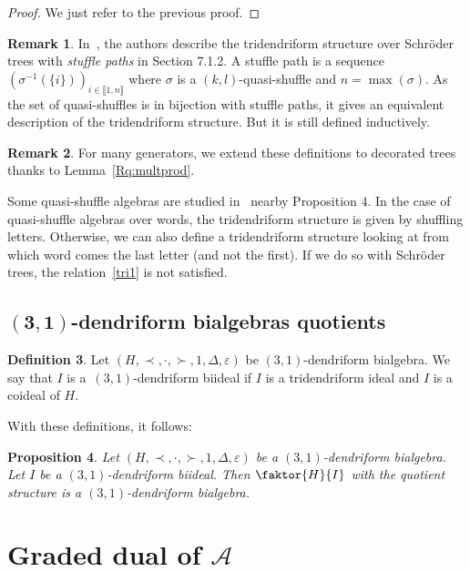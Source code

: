 \documentclass[pdftex]{sigma}
\numberwithin{equation}{section}
\theoremstyle{definition}
\newtheorem{defi}{Definition}[section]
\newtheorem{Rq}[defi]{Remark}
\theoremstyle{plain}
\newtheorem{Prop}[defi]{Proposition}
\newcommand{\IEM}[2]{\llbracket #1,#2 \rrbracket}
\begin{document}
\begin{proof}
	We just refer to the previous proof.
\end{proof}

\begin{Rq}
	In~\cite{Tridend+co}, the authors describe the tridendriform structure over Schr\"oder trees with \emph{stuffle paths} in Section 7.1.2. A stuffle path is a sequence $\left(\sigma^{-1}(\{i\})\right)_{i\in \IEM{1}{n}}$ where $\sigma$ is a $(k,l)$-quasi-shuffle and $n=\max(\sigma).$ As the set of quasi-shuffles is in bijection with stuffle paths, it gives an equivalent description of the tridendriform structure. But it is still defined inductively.
\end{Rq}
\begin{Rq}
		For many generators, we extend these definitions to decorated trees thanks to Lemma~\ref{Rq:multprod}.
\end{Rq}
Some quasi-shuffle algebras are studied in~\cite{Quasi-shuffle} nearby Proposition $4$. In the case of quasi-shuffle algebras over words, the tridendriform structure is given by shuffling letters. Otherwise, we can also define a tridendriform structure looking at from which word comes the last letter (and not the first). If we do so with Schr\"oder trees, the relation~\eqref{tri1} is not satisfied.

\subsection[(3,1)-dendriform bialgebras quotients]{$\boldsymbol{(3,1)}$-dendriform bialgebras quotients}
\begin{defi}
	Let $(H,\prec,\cdot,\succ,1,\Delta,\varepsilon)$ be $(3,1)$-dendriform bialgebra. We say that $I$ is a~$(3,1)$-dendriform biideal if $I$ is a tridendriform ideal and $I$ is a coideal of $H$.
\end{defi}
With these definitions, it follows:
\begin{Prop}
	Let $(H,\prec,\cdot,\succ,1,\Delta,\varepsilon)$ be a $(3,1)$-dendriform bialgebra. Let $I$ be a $(3,1)$-dendriform biideal. Then $\faktor{H}{I}$ with the quotient structure is a $(3,1)$-dendriform bialgebra.
\end{Prop}


\section[Graded dual of A]{Graded dual of $\boldsymbol{\mathcal{A}}$} \label{sec4}
\end{document}
